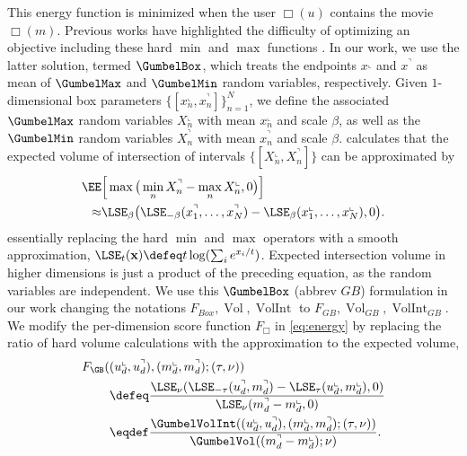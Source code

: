 This energy function is minimized when the user  $\Box(u)$ contains the movie $\Box(m)$. Previous works have highlighted the difficulty of optimizing an objective including these hard $\min$ and $\max$ functions \citep{softbox, gumbel_box}. 
In our work, we use the latter solution, termed $\GumbelBox$, which treats the endpoints $x^\llcorner$ and $x^\urcorner$ as mean of $\GumbelMax$ and $\GumbelMin$ random variables, respectively. Given $1$-dimensional box parameters $\{[x_n^\llcorner, x_n^\urcorner]\}_{n=1}^N$, we define the associated $\GumbelMax$ random variables $X_n^\llcorner$ with mean $x_n^\llcorner$ and scale $\beta$, as well as the $\GumbelMin$ random variables $X_n^\urcorner$ with mean $x_n^\urcorner$ and scale $\beta$. \citet{gumbel_box} calculates that the expected volume of intersection of intervals $\{[X_n^\llcorner, X_n^\urcorner]\}$ can be approximated by
\begin{align*}
\EE&\Big[\max\big(\min_n X_n^\urcorner - \max_n X_n^\llcorner, 0\big)\Big] \notag \\
\approx & \LSE_\beta \big( \LSE_{-\beta} (x_1^\urcorner, \ldots, x_N^\urcorner) - \LSE_{\beta}(x_1^\llcorner, \ldots, x_N^\llcorner), 0\big).
\end{align*}
essentially replacing the hard $\min$ and $\max$ operators with a smooth approximation, $\LSE_t(\mathbf x) \defeq t \log(\sum_i e^{x_i/t})$. Expected intersection volume in higher dimensions is just a product of the preceding equation, as the random variables are independent.
{We use this $\GumbelBox$ (abbrev $GB$) formulation in our work changing the notations $F_{Box}, \operatorname{Vol}, \operatorname{VolInt}$  to $F_{GB}, \operatorname{Vol}_{GB}, \operatorname{VolInt}_{GB}$. We modify the per-dimension score function $F_\Box$ in \eqref{eq:energy} by replacing the ratio of hard volume calculations with the approximation to the expected volume,}
\begin{align}
F_\GB(&(u_d^\llcorner, u_d^\urcorner), (m_d^\llcorner, m_d^\urcorner); (\tau, \nu)) \notag \\ &\defeq \frac{\LSE_\nu(\LSE_{-\tau}(u_d^\urcorner, m_d^\urcorner) - \LSE_\tau(u_d^\llcorner, m_d^\llcorner), 0)}{\LSE_\nu(m_d^\urcorner - m_d^\llcorner, 0)} \notag \\
&\eqdef \frac{\GumbelVolInt((u_d^\llcorner, u_d^\urcorner), (m_d^\llcorner, m_d^\urcorner); (\tau, \nu))}{\GumbelVol((m_d^\urcorner - m_d^\llcorner); \nu)}.
\end{align}



